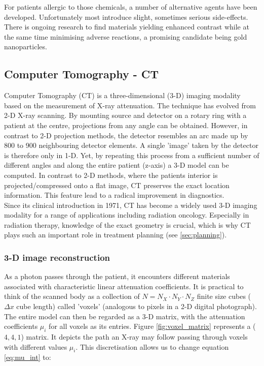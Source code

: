 For patients allergic to those chemicals, a number of alternative agents have been developed.
Unfortunately most introduce slight, sometimes serious side-effects.
There is ongoing research to find materials yielding enhanced contrast while at the same time minimising adverse reactions, a promising candidate being gold nanoparticles. \cite{Podgorsak, Maidment2014}


\subsection{Computer Tomography - CT}

Computer Tomography (CT) is a three-dimensional (3-D) imaging modality based on the measurement of X-ray attenuation.
The technique has evolved from 2-D X-ray scanning.
By mounting source and detector on a rotary ring with a patient at the centre, projections from any angle can be obtained.
However, in contrast to 2-D projection methods, the detector resembles an arc made up by 800 to 900 neighbouring detector elements.
A single 'image' taken by the detector is therefore only in 1-D.
Yet, by repeating this process from a sufficient number of different angles and along the entire patient (z-axis) a 3-D model can be computed.
In contrast to 2-D methods, where the patients interior is projected/compressed onto a flat image, CT preserves the exact location information. This feature lead to a radical improvement in diagnostics.	 \\

Since its clinical introduction in 1971, CT has become a widely used 3-D imaging modality for a range of applications including radiation oncology. Especially in radiation therapy, knowledge of the exact geometry is crucial, which is why CT plays such an important role in treatment planning (see \ref{sec:planning}). \cite{Podgorsak, Maidment2014}

\subsubsection{3-D image reconstruction}
As a photon passes through the patient, it encounters different materials associated with characteristic linear attenuation coefficients.
It is practical to think of the scanned body as a collection of $N = N_X\cdot N_Y\cdot N_Z$ finite size cubes ($\Delta x$ cube length) called 'voxels' (analogous to pixels in a 2-D digital photograph).
The entire model can then be regarded as a 3-D matrix, with the attenuation coefficients $\mu_i$ for all voxels as its entries.
Figure \ref{fig:voxel_matrix} represents a ($4, 4, 1$) matrix.
It depicts the path an X-ray may follow passing through voxels with different values $\mu_i$.
This discretisation allows us to change equation \ref{eq:mu_int} to:

